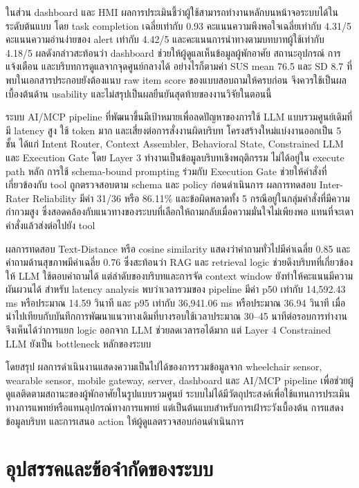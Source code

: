 ในส่วน dashboard และ HMI ผลการประเมินชี้ว่าผู้ใช้สามารถทำงานหลักบนหน้าจอระบบได้ในระดับต้นแบบ โดย task completion เฉลี่ยเท่ากับ 0.93 คะแนนความพึงพอใจเฉลี่ยเท่ากับ 4.31/5 คะแนนความอ่านง่ายของ alert เท่ากับ 4.42/5 และคะแนนการนำทางตามบทบาทผู้ใช้เท่ากับ 4.18/5 ผลดังกล่าวสะท้อนว่า dashboard ช่วยให้ผู้ดูแลเห็นข้อมูลผู้พักอาศัย สถานะอุปกรณ์ การแจ้งเตือน และบริบทการดูแลจากจุดศูนย์กลางได้ อย่างไรก็ตามค่า SUS mean 76.5 และ SD 8.7 ที่พบในเอกสารประกอบยังต้องแนบ raw item score ของแบบสอบถามให้ครบก่อน จึงควรใช้เป็นผลเบื้องต้นด้าน usability และไม่สรุปเป็นผลยืนยันสุดท้ายของงานวิจัยในตอนนี้

ระบบ AI/MCP pipeline ที่พัฒนาขึ้นมีเป้าหมายเพื่อลดปัญหาของการใช้ LLM แบบรวมศูนย์เดิมที่มี latency สูง ใช้ token มาก และเสี่ยงต่อการสั่งงานผิดบริบท โครงสร้างใหม่แบ่งงานออกเป็น 5 ชั้น ได้แก่ Intent Router, Context Assembler, Behavioral State, Constrained LLM และ Execution Gate โดย Layer 3 ทำงานเป็นข้อมูลบริบทเชิงพฤติกรรม ไม่ได้อยู่ใน execute path หลัก การใช้ schema-bound prompting ร่วมกับ Execution Gate ช่วยให้คำสั่งที่เกี่ยวข้องกับ tool ถูกตรวจสอบตาม schema และ policy ก่อนดำเนินการ ผลการทดสอบ Inter-Rater Reliability มีค่า 31/36 หรือ 86.11\% และข้อผิดพลาดทั้ง 5 กรณีอยู่ในกลุ่มคำสั่งที่มีความกำกวมสูง ซึ่งสอดคล้องกับแนวทางของระบบที่เลือกให้ถามกลับเมื่อความมั่นใจไม่เพียงพอ แทนที่จะเดาคำสั่งแล้วส่งต่อไปยัง tool

ผลการทดสอบ Text-Distance หรือ cosine similarity แสดงว่าคำถามทั่วไปมีค่าเฉลี่ย 0.85 และคำถามด้านสุขภาพมีค่าเฉลี่ย 0.76 ซึ่งสะท้อนว่า RAG และ retrieval logic ช่วยดึงบริบทที่เกี่ยวข้องให้ LLM ใช้ตอบคำถามได้ แต่ลำดับของบริบทและการจัด context window ยังทำให้คะแนนมีความผันผวนได้ สำหรับ latency analysis พบว่าเวลารวมของ pipeline มีค่า p50 เท่ากับ 14,592.43 ms หรือประมาณ 14.59 วินาที และ p95 เท่ากับ 36,941.06 ms หรือประมาณ 36.94 วินาที เมื่อนำไปเทียบกับบันทึกการพัฒนาแนวทางเดิมที่บางรอบใช้เวลาประมาณ 30--45 นาทีต่อรอบการทำงาน จึงเห็นได้ว่าการแยก logic ออกจาก LLM ช่วยลดเวลารอได้มาก แต่ Layer 4 Constrained LLM ยังเป็น bottleneck หลักของระบบ

โดยสรุป ผลการดำเนินงานแสดงความเป็นไปได้ของการรวมข้อมูลจาก wheelchair sensor, wearable sensor, mobile gateway, server, dashboard และ AI/MCP pipeline เพื่อช่วยผู้ดูแลติดตามสถานะของผู้พักอาศัยในรูปแบบรวมศูนย์ ระบบไม่ได้มีวัตถุประสงค์เพื่อใช้แทนการประเมินทางการแพทย์หรือแทนอุปกรณ์ทางการแพทย์ แต่เป็นต้นแบบสำหรับการเฝ้าระวังเบื้องต้น การแสดงข้อมูลบริบท และการเสนอ action ให้ผู้ดูแลตรวจสอบก่อนดำเนินการ

\section{อุปสรรคและข้อจำกัดของระบบ}
\label{sec:ch5_limitations}

